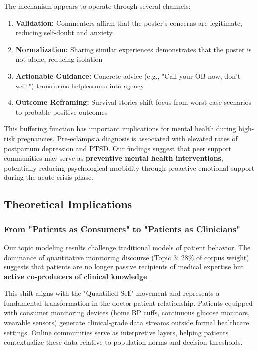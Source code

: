 \documentclass[12pt, a4paper]{article}
\begin{document}
The mechanism appears to operate through several channels:
\begin{enumerate}
    \item \textbf{Validation:} Commenters affirm that the poster's concerns are legitimate, reducing self-doubt and anxiety
    \item \textbf{Normalization:} Sharing similar experiences demonstrates that the poster is not alone, reducing isolation
    \item \textbf{Actionable Guidance:} Concrete advice (e.g., "Call your OB now, don't wait") transforms helplessness into agency
    \item \textbf{Outcome Reframing:} Survival stories shift focus from worst-case scenarios to probable positive outcomes
\end{enumerate}

This buffering function has important implications for mental health during high-risk pregnancies. Pre-eclampsia diagnosis is associated with elevated rates of postpartum depression and PTSD. Our findings suggest that peer support communities may serve as \textbf{preventive mental health interventions}, potentially reducing psychological morbidity through proactive emotional support during the acute crisis phase.

\subsection{Theoretical Implications}

\subsubsection{From "Patients as Consumers" to "Patients as Clinicians"}
Our topic modeling results challenge traditional models of patient behavior. The dominance of quantitative monitoring discourse (Topic 3: 28\% of corpus weight) suggests that patients are no longer passive recipients of medical expertise but \textbf{active co-producers of clinical knowledge}.

This shift aligns with the "Quantified Self" movement and represents a fundamental transformation in the doctor-patient relationship. Patients equipped with consumer monitoring devices (home BP cuffs, continuous glucose monitors, wearable sensors) generate clinical-grade data streams outside formal healthcare settings. Online communities serve as interpretive layers, helping patients contextualize these data relative to population norms and decision thresholds.
\end{document}
